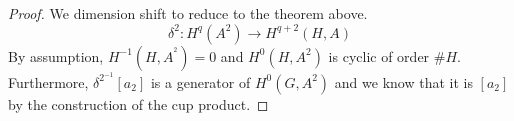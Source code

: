 \documentclass[../main.tex]{subfiles}
\begin{document}
\begin{proof}
We dimension shift to reduce to the theorem above.\\
\[ 
\delta^{2}: H^{q}( A^{2}) \to H^{q+2}( H,A) 
\]
By assumption, $H^{-1}( H,A^{^{2}}) =0$ and $H^{0}( H,A^{2}) $ is cyclic of order $\# H$.\\
Furthermore, $\delta^{2}^{-1}[a_2]$ is a generator of $H^{0}( G,A^{2}) $ and we know that it is $[a_2]$ by the construction of the cup product.
\end{proof}
\end{document}
